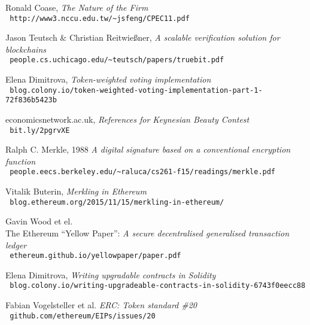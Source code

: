 \begin{thebibliography}{9}
  
  Ronald Coase,
  \emph{The Nature of the Firm\\}
  \verb| http://www3.nccu.edu.tw/~jsfeng/CPEC11.pdf |  
  
  
  Jason Teutsch \& Christian Reitwießner,
  \emph{A scalable verification solution for blockchains\\}
  \verb| people.cs.uchicago.edu/~teutsch/papers/truebit.pdf |
  
  Elena Dimitrova,
  \emph{Token-weighted voting implementation\\}
  \verb| blog.colony.io/token-weighted-voting-implementation-part-1-72f836b5423b |
  
  economicsnetwork.ac.uk,
  \emph{References for Keynesian Beauty Contest\\}
  \verb| bit.ly/2pgrvXE |

  Ralph C. Merkle, 1988
  \emph{A digital signature based on a conventional encryption function\\}
  \verb| people.eecs.berkeley.edu/~raluca/cs261-f15/readings/merkle.pdf | 

  Vitalik Buterin,
  \emph{Merkling in Ethereum\\}
  \verb| blog.ethereum.org/2015/11/15/merkling-in-ethereum/ |
  
  Gavin Wood et el.\\
  The Ethereum ``Yellow Paper'':
  \emph{A secure decentralised generalised transaction ledger\\}
  \verb| ethereum.github.io/yellowpaper/paper.pdf |
  
  Elena Dimitrova,
  \emph{Writing upgradable contracts in Solidity\\}
  \verb| blog.colony.io/writing-upgradeable-contracts-in-solidity-6743f0eecc88 |
  
  Fabian Vogelsteller et al.
  \emph{ERC: Token standard \#20\\}
  \verb| github.com/ethereum/EIPs/issues/20 |
  
\end{thebibliography}